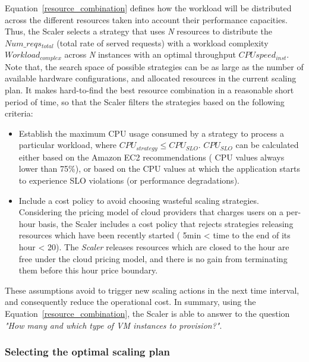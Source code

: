 Equation~\ref{resource_combination} defines how the workload will be distributed across the different resources taken into account their performance capacities.  Thus, the Scaler selects a strategy that uses \emph{N} resources to distribute the \emph{$Num\_reqs_{total}$} (total rate of served requests) with a workload complexity \emph{$Workload_{complex}$} across \emph{N} instances with an optimal throughput \emph{$CPUspeed_{inst}$}. Note that, the search space of possible strategies can be as large as the number of available hardware configurations, and allocated resources in the current scaling plan. It makes hard-to-find the best resource combination in a reasonable short period of time, so that the Scaler filters the strategies based on the following criteria:
\begin{itemize}
\item Establish the maximum CPU usage consumed by a strategy to process a particular workload, where \emph{$CPU_{strategy} \leq CPU_{SLO}$}. \emph{$CPU_{SLO}$} can be calculated either based on the Amazon EC2 recommendations ( CPU values always lower than 75\%), or based on the CPU values at which the application starts to experience SLO violations (or performance degradations). 

\item Include a cost policy to avoid choosing wasteful scaling strategies. Considering the pricing model of cloud providers that charges users on a per-hour basis, the Scaler includes a cost policy that rejects strategies releasing resources which have been recently started ( 5min < time to the end of its hour < 20). The \emph{Scaler} releases resources which are closed to the hour are free under the cloud pricing model, and there is no gain from terminating them before this hour price boundary.

\end{itemize}


These assumptions avoid to trigger new scaling actions in the next time interval, and consequently reduce the operational cost. In summary, using the Equation~\ref{resource_combination}, the Scaler is able to answer to the question \emph{"How many and which type of VM instances to provision?"}.


\subsubsection{Selecting the optimal scaling plan}

